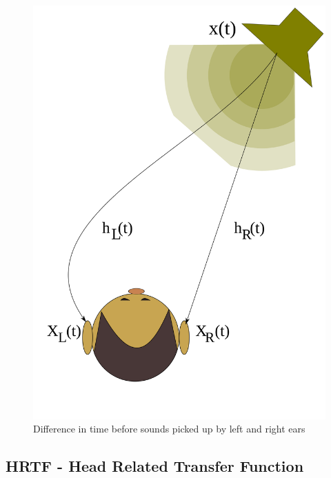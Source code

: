 \documentclass[a4paper,12pt,oneside]{article}
\begin{document}
\begin{center}
\begin{figure}[H]
    \centering
    \includegraphics[scale=0.08]{hrtf.png}
    \caption{Difference in time before sounds picked up by left and right ears}
    \label{fig:idt}
\end{figure}
\end{center}

\subsection{HRTF - Head Related Transfer Function}
  
\end{document}
